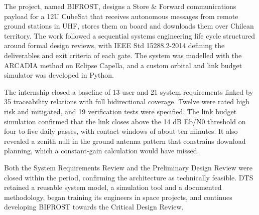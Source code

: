 The project, named BIFROST, designs a Store \& Forward communications payload
for a 12U CubeSat that receives autonomous messages from remote ground stations
in UHF, stores them on board and downloads them over Chilean territory. The work followed a sequential systems engineering life cycle
structured around formal design reviews, with IEEE Std 15288.2-2014 defining the
deliverables and exit criteria of each gate. The system was modelled
with the ARCADIA method on Eclipse Capella, and a custom orbital and link budget
simulator was developed in Python.

The internship closed a baseline of 13 user and 21 system requirements linked by
35 traceability relations with full bidirectional coverage. Twelve were rated
high risk and mitigated, and 19 verification tests were specified. The link budget simulation confirmed
that the link closes above the 14 dB Eb/N0 threshold on four to five daily
passes, with contact windows of about ten minutes. It also revealed a zenith
null in the ground antenna pattern that constrains download planning, which a
constant-gain calculation would have missed.

Both the System Requirements Review and the Preliminary Design Review were
closed within the period, confirming the architecture as technically feasible. DTS retained a reusable system
model, a simulation tool and a documented methodology, began training its engineers in space
projects, and continues developing BIFROST towards the Critical Design Review.

\newpage
